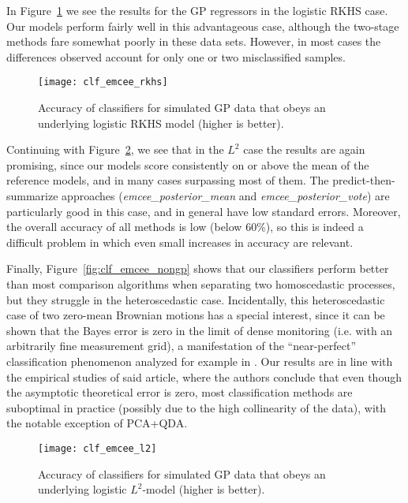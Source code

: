 In Figure~\ref{fig:clf_emcee_rkhs} we see the results for the GP regressors in the logistic RKHS case. Our models perform fairly well in this advantageous case, although the two-stage methods fare somewhat poorly in these data sets. However, in most cases the differences observed account for only one or two misclassified samples.

\begin{figure}[ht!]
  \centering
  \texttt{[image: clf\_emcee\_rkhs]}
  \caption{Accuracy of classifiers for simulated GP data that obeys an underlying logistic RKHS model (higher is better).}\label{fig:clf_emcee_rkhs}
\end{figure}

Continuing with Figure~\ref{fig:clf_emcee_l2}, we see that in the \(L^2\) case the results are again promising, since our models score consistently on or above the mean of the reference models, and in many cases surpassing most of them. The predict-then-summarize approaches (\textit{emcee\_posterior\_mean} and \textit{emcee\_posterior\_vote}) are particularly good in this case, and in general have low standard errors. Moreover, the overall accuracy of all methods is low (below 60\%), so this is indeed a difficult problem in which even small increases in accuracy are relevant.

Finally, Figure~\ref{fig:clf_emcee_nongp} shows that our classifiers perform better than most comparison algorithms when separating two homoscedastic processes, but they struggle in the heteroscedastic case. Incidentally, this heteroscedastic case of two zero-mean Brownian motions has a special interest, since it can be shown that the Bayes error is zero in the limit of dense monitoring (i.e. with an arbitrarily fine measurement grid), a manifestation of the ``near-perfect'' classification phenomenon analyzed for example in \citet{torrecilla2020optimal}. Our results are in line with the empirical studies of said article, where the authors conclude that even though the asymptotic theoretical error is zero, most classification methods are suboptimal in practice (possibly due to the high collinearity of the data), with the notable exception of PCA+QDA.

\begin{figure}[htbp!]
  \centering
  \texttt{[image: clf\_emcee\_l2]}
  \caption{Accuracy of classifiers for simulated GP data that obeys an underlying logistic \(L^2\)-model (higher is better).}\label{fig:clf_emcee_l2}
\end{figure}

